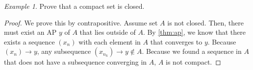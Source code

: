 \documentclass[11pt]{article}
\theoremstyle{plain}
\theoremstyle{definition}
\theoremstyle{remark}
\newtheorem{exm}{Example}[section]
\begin{document}
\begin{exm}
    Prove that a compact set is closed.
\end{exm}
\begin{proof}
    We prove this by contrapositive. Assume set $A$ is not closed. Then, there must exist an AP $y$ of $A$ that lies outside of $A$. By \ref{thm:ap}, we know that there exists a sequence $(x_n)$ with each element in $A$ that converges to $y$. Because $(x_n) \rightarrow y$, any subsequence $(x_{n_k}) \rightarrow y \notin A$. Because we found a sequence in $A$ that does not have a subsequence converging in $A$, $A$ is not compact.
\end{proof}




% 
% 

\end{document}
